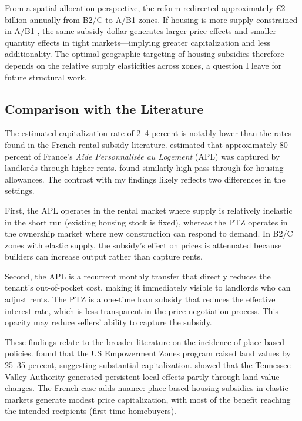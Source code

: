 \documentclass[12pt]{article}
\begin{document}
From a spatial allocation perspective, the reform redirected approximately \euro{2} billion annually from B2/C to A/B1 zones. If housing is more supply-constrained in A/B1 \citep{combes2018}, the same subsidy dollar generates larger price effects and smaller quantity effects in tight markets---implying greater capitalization and less additionality. The optimal geographic targeting of housing subsidies therefore depends on the relative supply elasticities across zones, a question I leave for future structural work.

\subsection{Comparison with the Literature}

The estimated capitalization rate of 2--4 percent is notably lower than the rates found in the French rental subsidy literature. \citet{fack2006} estimated that approximately 80 percent of France's \textit{Aide Personnalis\'{e}e au Logement} (APL) was captured by landlords through higher rents. \citet{laferrere2009} found similarly high pass-through for housing allowances. The contrast with my findings likely reflects two differences in the settings.

First, the APL operates in the rental market where supply is relatively inelastic in the short run (existing housing stock is fixed), whereas the PTZ operates in the ownership market where new construction can respond to demand. In B2/C zones with elastic supply, the subsidy's effect on prices is attenuated because builders can increase output rather than capture rents.

Second, the APL is a recurrent monthly transfer that directly reduces the tenant's out-of-pocket cost, making it immediately visible to landlords who can adjust rents. The PTZ is a one-time loan subsidy that reduces the effective interest rate, which is less transparent in the price negotiation process. This opacity may reduce sellers' ability to capture the subsidy.

These findings relate to the broader literature on the incidence of place-based policies. \citet{busso2013} found that the US Empowerment Zones program raised land values by 25--35 percent, suggesting substantial capitalization. \citet{kline2013} showed that the Tennessee Valley Authority generated persistent local effects partly through land value changes. The French case adds nuance: place-based housing subsidies in elastic markets generate modest price capitalization, with most of the benefit reaching the intended recipients (first-time homebuyers).
\end{document}
